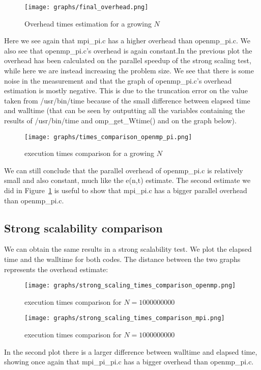 \documentclass{article}
\begin{document}
\begin{figure}[H] %
	\centering
	\texttt{[image: graphs/final\_overhead.png]} %
	\caption{Overhead times estimation for a growing $N$}
	 \label{fig:overhead_graph}
\end{figure}
Here we see again that mpi\_pi.c has a higher overhead than openmp\_pi.c. We also see that openmp\_pi.c's overhead is again constant.In the previous plot the overhead has been calculated on the parallel speedup of the strong scaling test, while here we are instead increasing the problem size.
We see that there is some noise in the measurement and that the graph of openmp\_pi.c's overhead estimation is mostly negative.
This is due to the truncation error on the value taken from /usr/bin/time because of the small difference between elapsed time and walltime (that can be seen by outputting all the variables containing the results of /usr/bin/time and omp\_get\_Wtime() and on the graph below).

\begin{figure}[H] %
	\centering
	\texttt{[image: graphs/times\_comparison\_openmp\_pi.png]} %
	\caption{execution times comparison for a growing $N$}
\end{figure}


We can still conclude that the parallel overhead of openmp\_pi.c is relatively small and also constant, much like the e(n,t) estimate. The second estimate we did in Figure~\ref{fig:overhead_graph} is useful to show that mpi\_pi.c has a bigger parallel overhead than openmp\_pi.c.

\subsection{Strong scalability comparison}
We can obtain the same results in a strong scalability test.
We plot the elapsed time and the walltime for both codes. The distance between the two graphs represents the overhead estimate:
\begin{figure}[H] %
	\centering
	\texttt{[image: graphs/strong\_scaling\_times\_comparison\_openmp.png]} %
	\caption{execution times comparison for $N=1000000000$}
\end{figure}
\begin{figure}[H] %
	\centering
	\texttt{[image: graphs/strong\_scaling\_times\_comparison\_mpi.png]} %
	\caption{execution times comparison for $N=1000000000$}
\end{figure}
In the second plot there is a larger difference between walltime and elapsed time, showing once again that mpi\_pi\_pi.c has a bigger overhead than openmp\_pi.c.
\end{document}
